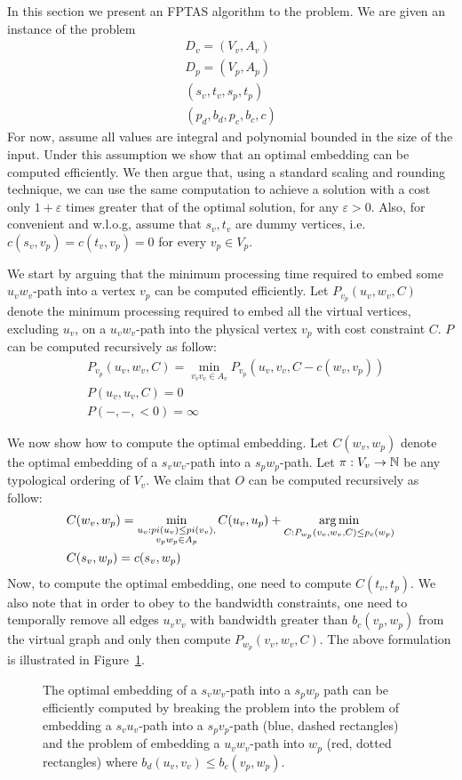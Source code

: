 In this section we present an FPTAS algorithm to the \VPN{} problem.
We are given an instance of the \VPN{} problem 
\begin{align*}
D_v = (V_v, A_v)		\\
D_p = (V_p, A_p)		\\
(s_v, t_v, s_p, t_p)	\\
(p_d, b_d, p_c, b_c, c)
\end{align*}
For now, assume all values are integral and polynomial bounded in the size of
the input.
Under this assumption we show that an optimal embedding can be computed
efficiently.
We then argue that, using a standard scaling and rounding technique, we can use
the same computation to achieve a solution with a cost only
$1 + \varepsilon$ times greater that of the optimal solution, for any
$\varepsilon > 0$.
Also, for convenient and w.l.o.g, assume that $s_v, t_v$ are dummy vertices, 
i.e. $c(s_v, v_p) = c(t_v, v_p) = 0$ for every $v_p \in V_p$.

We start by arguing that the minimum processing time required to embed some
$u_vw_v$-path into a vertex $v_p$ can be computed efficiently.
Let $P_{v_p}(u_v, w_v, C)$ denote the minimum processing required to embed
all the virtual vertices, excluding $u_v$, on a $u_vw_v$-path into the physical
vertex $v_p$ with cost constraint $C$.
$P$ can be computed recursively as follow:
\begin{align*}
&P_{v_p}(u_v, w_v, C) = 
\min_{v_vv_v \in A_v} P_{v_p}(u_v, v_v, C - c(w_v, v_p))
\\
&P(u_v, u_v, C) = 0
\\
&P(-, -, <0) = \infty
\end{align*}
 
We now show how to compute the optimal embedding.
Let $C(w_v, w_p)$ denote the
optimal embedding of a $s_vw_v$-path into a $s_pw_p$-path.
Let $\pi:V_v \to \mathbb{N}$ be any typological ordering of $V_v$. 
We claim that $O$ can be computed recursively as follow:
\begin{align*}
&C(w_v, w_p) = 
\min_{\substack{
u_v : pi(u_v) \leq pi(v_v), 
\\
v_pw_p \in A_p
}}
C(u_v, u_p)
+
\operatorname*{arg\,min}_{C : P_{w_p}(v_v, w_v, C) \leq p_c(w_p)}
\\
&C(s_v, w_p) = c(s_v, w_p)
\end{align*}
Now, to compute the optimal embedding, one need to compute $C(t_v, t_p)$. 
We also note that in order to obey to the bandwidth constraints, 
one need to temporally remove all edges $u_vv_v$ with bandwidth greater than
$b_c(v_p, w_p)$ from the virtual graph and only then compute $P_{w_p}(v_v, w_v, C)$.
The above formulation is illustrated in Figure~\ref{fig:dp1}.

\begin{figure}[ht]
\centering

\caption[]{
\label{fig:dp1}
The optimal embedding of a $s_vw_v$-path into a $s_pw_p$ path can be efficiently 
computed by breaking the problem into the problem of embedding a $s_vu_v$-path
into a $s_pv_p$-path (blue, dashed rectangles) 
and the problem of embedding a $u_vw_v$-path into $w_p$ (red, dotted
rectangles) where $b_d(u_v, v_v) \leq b_c(v_p, w_p)$.
}
\end{figure}
